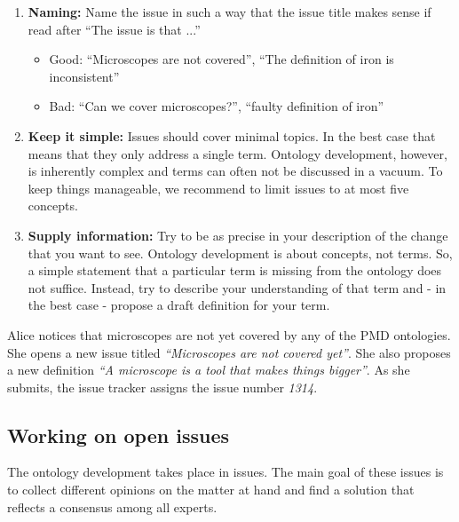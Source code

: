 \begin{enumerate}
    \item \textbf{Naming:} Name the issue in such a way that the issue title makes sense if read after ``The issue is that ...''
    \begin{itemize}
        \item Good: ``Microscopes are not covered'', ``The definition of iron is inconsistent''
        \item Bad: ``Can we cover microscopes?'', ``faulty definition of iron''
    \end{itemize}
    \item \textbf{Keep it simple:} Issues should cover minimal topics. In the best case that means that they only address a single term. Ontology development, however, is inherently complex and terms can often not be discussed in a vacuum. To keep things manageable, we recommend to limit issues to at most five concepts.
    \item \textbf{Supply information:} Try to be as precise in your description of the change that you want to see. Ontology development is about concepts, not terms. So, a simple statement that a particular term is missing from the ontology does not suffice. Instead, try to describe your understanding of that term and - in the best case - propose a draft definition for your term. 
\end{enumerate}

\begin{example}
    Alice notices that microscopes are not yet covered by any of the PMD ontologies. She opens a new issue titled \textit{``Microscopes are not covered yet''}. She also proposes a new definition \textit{``A microscope is a tool that makes things bigger''}. As she submits, the issue tracker assigns the issue number \textit{1314}.
\end{example}

\subsection{Working on open issues}

The ontology development takes place in {\github} issues. The main goal of these issues is to collect different opinions on the matter at hand and find a solution that reflects a consensus among all experts.

